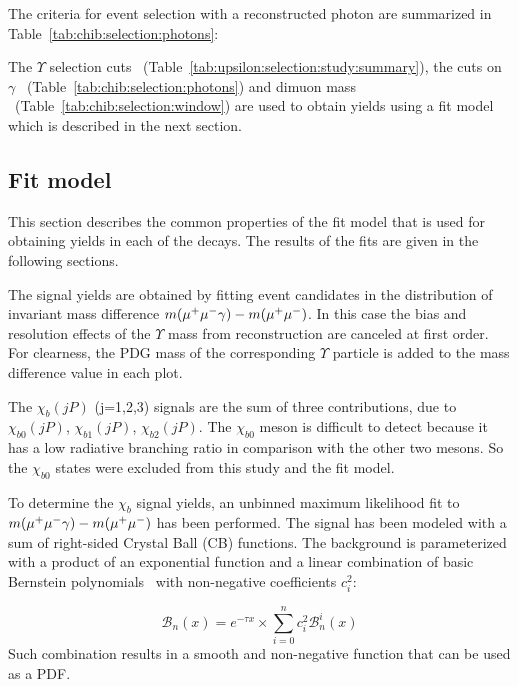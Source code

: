 The criteria for event selection with a reconstructed photon are summarized in
Table~\ref{tab:chib:selection:photons}:




The $\Upsilon$ selection cuts
~(Table~\ref{tab:upsilon:selection:study:summary}), the cuts  on $\gamma$
~(Table~\ref{tab:chib:selection:photons}) and dimuon mass  
~(Table~\ref{tab:chib:selection:window}) are used to obtain \chib yields
using a fit model which is described in the next section.
    
\subsection{Fit model}
\label{sec:chib:fit}

This section describes the common properties of the fit model that is used for
obtaining yields in each of the \chib decays. The results of the fits are
given in the following sections.

The \chib signal yields are obtained by fitting event candidates
in the distribution of invariant mass difference $m(\mu^+\mu^-\gamma) - m(\mu^+\mu^-)$.
In this case the bias and resolution effects of the $\Upsilon$ mass from reconstruction
are canceled at first order. For clearness, the PDG mass of the corresponding $\Upsilon$
particle is added to the mass difference value in each plot.

The $\chi_b(jP)$ (j=1,2,3) signals are the sum of three contributions, due to $\chi_{b0}(jP)$,
$\chi_{b1}(jP)$, $\chi_{b2}(jP)$. The $\chi_{b0}$ meson is difficult to detect
because it has a low radiative branching ratio in comparison with the other two
mesons. So the $\chi_{b0}$ states were excluded from this study and the fit
model.

To determine the $\chi_b$ signal yields, an unbinned maximum likelihood fit to
$m(\mu^+\mu^-\gamma) - m(\mu^+\mu^-)$ has been performed. The signal has been modeled with
a sum of right-sided Crystal Ball (CB)  functions. The background is parameterized with a
product of an exponential function and a linear combination of basic Bernstein
polynomials~\cite{Phillips:2003} with non-negative coefficients $c_{i}^2$:

\begin{equation}
\label{eq:bernstein}
{\mathscr B}_{n}(x) = e^{-\tau x} \times \sum_{i=0}^{n} c_{i}^2 {\mathscr B}_{n}^{i}(x)
\end{equation}
Such combination results in a smooth and non-negative function that can be used
as a PDF.

